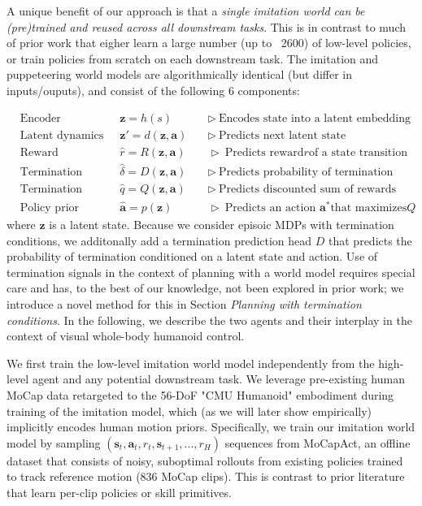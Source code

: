 \documentclass[sn-mathphys-num]{sn-jnl}%
\theoremstyle{thmstyleone}%
\theoremstyle{thmstyletwo}%
\theoremstyle{thmstylethree}%
\begin{document}
A unique benefit of our approach is that a \textit{single imitation world can be (pre)trained and reused across all downstream tasks}.
This is in contrast to much of prior work that eigher learn a large number (up to ~2600) of low-level policies, or train policies from scratch on each downstream task.
The imitation and puppeteering world models are algorithmically identical (but differ in inputs/ouputs), and consist of the following 6 components:

\begin{equation}\label{key}
	\begin{aligned}
		& \text{Encoder} & \mathbf{z} = h(s) &  \quad \triangleright \ \text{Encodes state into a latent embedding} \\
		& \text{Latent dynamics} & \mathbf{z}' = d(\mathbf{z}, \mathbf{a}) & \quad \triangleright \ \text{Predicts next latent state} \\
		& \text{Reward} & \hat{r} = R(\mathbf{z}, \mathbf{a})  & \quad \triangleright \ \text{Predicts reward} r \text{of a state transition} \\
		& \text{Termination} & \hat{\delta} = D(\mathbf{z}, \mathbf{a}) & \quad \triangleright \ \text{Predicts probability of termination} \\
		& \text{Termination value} & \hat{q} = Q(\mathbf{z}, \mathbf{a}) & \quad \triangleright \ \text{Predicts discounted sum of rewards} \\
		& \text{Policy prior} & \hat{\mathbf{a}} = p(\mathbf{z}) & \quad \triangleright \ \text{Predicts an action } \mathbf{a}^* \text{that maximizes} Q
	\end{aligned}
\end{equation}
where $ \mathbf{z} $ is a latent state.
Because we consider episoic MDPs with termination conditions, we additonally add a termination prediction head $ D $ that predicts the probability of termination conditioned on a latent state and action.
Use of termination signals in the context of planning with a world model requires special care and has, to the best of our knowledge, not been explored in prior work;
we introduce a novel method for this in Section \textit{Planning with termination conditions}.
In the following, we describe the two agents and their interplay in the context of visual whole-body humanoid control.


We first train the low-level imitation world model independently from the high-level agent and any potential downstream task.
We leverage pre-existing human MoCap data retargeted to the 56-DoF "CMU Humanoid" embodiment during training of the imitation model, which (as we will later show empirically) implicitly encodes human motion priors.
Specifically, we train our imitation world model by sampling $ (\mathbf{s}_t, \mathbf{a}_t, r_t, \mathbf{s}_{t+1}, ..., r_H) $ sequences from MoCapAct, an offline dataset that consists of noisy, suboptimal rollouts from existing policies trained to track reference motion (836 MoCap clips).
This is contrast to prior literature that learn per-clip policies or skill primitives.
\end{document}
